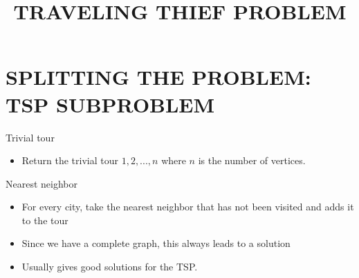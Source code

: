 \documentclass[newPxFont]{beamer}
\title{\textup{TRAVELING THIEF PROBLEM}}
\subtitle{}
\date{}
\author{}
\institute{}
\begin{document}
%
%

\maketitle


%
%

%
%

\section{\textup{SPLITTING THE PROBLEM: TSP SUBPROBLEM}}
\begin{frame}[c]{Trivial tour}
\vspace{-2em}
\begin{itemize}
	\item Return the trivial tour $1, 2, ..., n$ where $n$ is the number of vertices.
\end{itemize}
\vspace{2em}
\end{frame}

\begin{frame}[c]{Nearest neighbor}
\vspace{-2em}
\begin{itemize}
	\item For every city, take the nearest neighbor that has not been visited and adds it to the tour
	\item Since we have a complete graph, this always leads to a solution
	\item Usually gives good solutions for the TSP.
\end{itemize}
\vspace{2em}
\end{frame}
\end{document}
